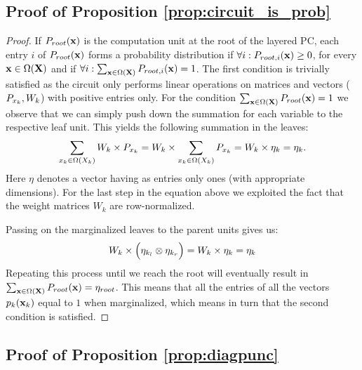 \subsection{Proof of Proposition \ref{prop:circuit_is_prob}}
\label{app:circuit_is_prob}

\proplpcvalid*

\begin{proof}
	If $P_{root} (\mathbf{x})$ is the computation unit at the root of the layered PC, each entry $i$ of $P_{root} (\mathbf{x})$ forms a probability distribution if $\forall i: P_{root, i}(\mathbf{x})\geq 0$, for every $\mathbf{x} \in \Omega(\mathbf{X})$ and if $\forall i: \sum_{\mathbf{x} \in \Omega(\mathbf{X})} P_{root, i}(\mathbf{x})=1$. The first condition is trivially satisfied as the circuit only performs linear operations on matrices and vectors ($P_{x_k}, W_k$) with positive entries only.
	For the condition $\sum_{\mathbf{x} \in \Omega(\mathbf{X})} P_{root}(\mathbf{x})=1$ we observe that we can simply push down the summation for each variable to the respective leaf unit. This yields the following summation in the leaves:
	\begin{align}
		\sum_{x_k \in \Omega(X_k)} W_k \times P_{x_k}
		=
		W_k \times \sum_{x_k \in \Omega(X_k)} P_{x_k}
		=
		W_k \times \eta_{k} = \eta_{k}.
	\end{align}
	Here $\eta$ denotes a vector having as entries only ones (with appropriate dimensions). For the last step in the equation above we exploited the fact that the weight matrices $W_k$ are row-normalized.

	Passing on the marginalized leaves to the parent units gives us:
	\begin{align}
		W_k \times \Bigl( \eta_{k_l} \otimes \eta_{k_r} \Bigr)
		=
		W_k \times \eta_{k}  =  \eta_k
	\end{align}
	Repeating this process until we reach the root will eventually result in $\sum_{\mathbf{x} \in \Omega(\mathbf{X})} P_{root}(\mathbf{x})=\eta_{root}$. This means that all the entries of all the vectors $p_k(\mathbf{x}_k)$ equal to $1$ when marginalized, which means in turn that the second condition is satisfied.
\end{proof}





\subsection{Proof of Proposition \ref{prop:diagpunc}}
\label{sec:proof:prop:diagpunc}


